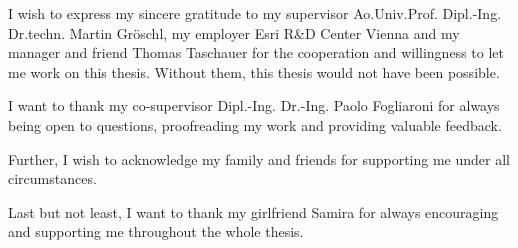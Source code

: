 I wish to express my sincere gratitude to my supervisor Ao.Univ.Prof. Dipl.-Ing. Dr.techn. Martin Gröschl, my employer Esri R\&D Center Vienna and my manager and friend Thomas Taschauer for the cooperation and willingness to let me work on this thesis. Without them, this thesis would not have been possible.

I want to thank my co-supervisor Dipl.-Ing. Dr.-Ing. Paolo Fogliaroni for always being open to questions, proofreading my work and providing valuable feedback.

Further, I wish to acknowledge my family and friends for supporting me under all circumstances.

Last but not least, I want to thank my girlfriend Samira for always encouraging and supporting me throughout the whole thesis.
